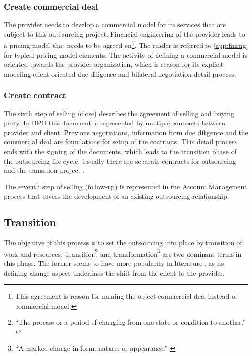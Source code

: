	\subsubsection{Create commercial deal}
	
	The provider needs to develop a commercial model for its services that are subject to this outsourcing project. Financial engineering of the provider leads to a pricing model that needs to be agreed on\footnote{This agreement is reason for naming the object commercial deal instead of commercial model.}. The reader is referred to \ref{app:fineng} for typical pricing model elements. The activity of defining a commercial model is oriented towards the provider organization, which is reason for its explicit modeling \wrt client-oriented due diligence and bilateral negotiation detail process. 
	
	\subsubsection{Create contract}
	
	The sixth step of selling (close) describes the agreement of selling and buying party. In \acrshort{BPO} this document is represented by multiple contracts between provider and client. Previous negotiations, information from due diligence and the commercial deal are foundations for setup of the contracts. This detail process ends with the signing of the documents, which leads to the transition phase of the outsourcing life cycle. Usually there are separate contracts for outsourcing and the transition project \citep{bitkom2008}. 
	
	The seventh step of selling (follow-up) is represented in the Account Management process that covers the development of an existing outsourcing relationship. 
	
		
	\subsection{Transition}
	The objective of this process is to set the outsourcing into place by transition of work and resources. Transition\footnote{\enquote{The process or a period of changing from one state or condition to another.} \citep{oxfordtransition}} and transformation\footnote{\enquote{A marked change in form, nature, or appearance.} \citep{oxfordtransformation}} are two dominant terms in this phase. The former seems to have more popularity in literature \citep{perunovic2007outsourcing}, as its defining change aspect underlines the shift from the client to the provider. 
	
